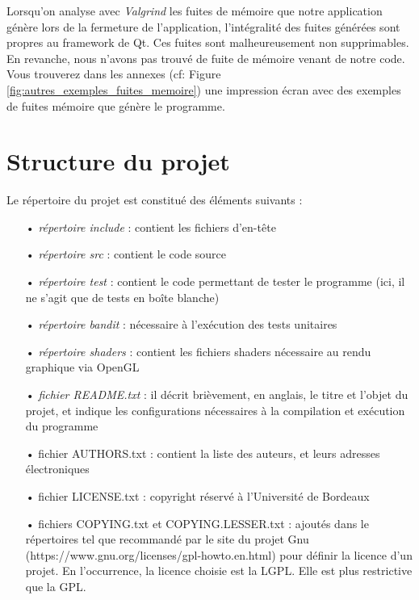 \documentclass[12pt]{article}
\begin{document}
		Lorsqu'on analyse avec \textit{Valgrind} les fuites de mémoire que notre application
		génère lors de la fermeture de l'application, l’intégralité des fuites
		générées sont propres au framework de Qt. Ces fuites sont malheureusement non
		supprimables.\\
		En revanche, nous n'avons pas trouvé de fuite de mémoire venant de notre code.\\
		
		Vous trouverez dans les annexes (cf: Figure \ref{fig:autres_exemples_fuites_memoire}) une
		impression écran avec des exemples de fuites mémoire que génère le programme.


\clearpage
\newpage
\part{Structure du projet}
	Le répertoire du projet est constitué des éléments suivants :\\
	\begin{itemize}
	\item[•] \textit{répertoire  include }: contient les fichiers d’en-tête\\
	\item[•] \textit{répertoire  src} : contient le code source\\
	\item[•] \textit{répertoire test }: contient le code permettant de tester le programme (ici, il ne s’agit que de tests en boîte blanche)\\
	\item[•] \textit{répertoire bandit} : nécessaire à l'exécution des tests unitaires\\
	\item[•] \textit{répertoire shaders} : contient les fichiers shaders nécessaire au rendu graphique via OpenGL\\
	\item[•] \textit{fichier README.txt} : il décrit brièvement, en anglais, le titre et l’objet du projet, et indique les configurations nécessaires à la compilation et exécution du programme\\
	\item[•] fichier AUTHORS.txt : contient la liste des auteurs, et leurs adresses électroniques\\
	\item[•] fichier LICENSE.txt : copyright réservé à l’Université de Bordeaux\\
	\item[•] fichiers COPYING.txt et COPYING.LESSER.txt : ajoutés dans le répertoires tel que recommandé par le site du projet Gnu (https://www.gnu.org/licenses/gpl-howto.en.html) pour définir la licence d’un projet. En l’occurrence, la licence choisie est la LGPL. Elle est plus restrictive que la GPL.
	\end{itemize}
	
\end{document}
